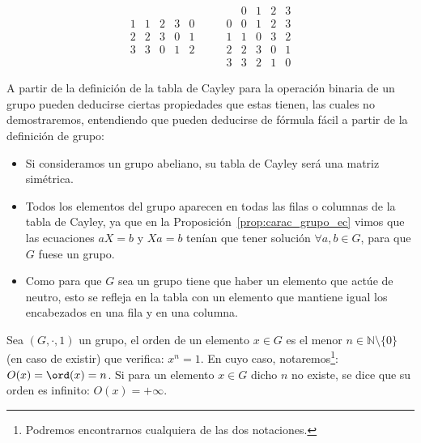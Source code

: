 \begin{ejemplo}
\begin{enumerate}
\begin{equation*}
\begin{array}{c|cccc}
                    1 & 1 & 2 & 3 & 0 \\
                    2 & 2 & 3 &  0 & 1 \\
                    3 & 3 & 0 & 1 & 2
                \end{array} \qquad 
                \begin{array}{c|cccc}
                     & 0 & 1 & 2 & 3 \\
                     \hline 
                    0 & 0 & 1 & 2 & 3 \\
                    1 & 1 & 0 & 3  & 2\\
                    2& 2 & 3 & 0 & 1 \\ 
                    3 & 3 & 2 & 1 & 0
                \end{array}
            \end{equation*}
    \end{enumerate}
    A partir de la definición de la tabla de Cayley para la operación binaria de un grupo pueden deducirse ciertas propiedades que estas tienen, las cuales no demostraremos, entendiendo que pueden deducirse de fórmula fácil a partir de la definición de grupo:
    \begin{itemize}
        \item Si consideramos un grupo abeliano, su tabla de Cayley será una matriz simétrica.
        \item Todos los elementos del grupo aparecen en todas las filas o columnas de la tabla de Cayley, ya que en la Proposición~\ref{prop:carac_grupo_ec} vimos que las ecuaciones $aX=b$ y $Xa=b$ tenían que tener solución $\forall a,b\in G$, para que $G$ fuese un grupo.
        \item Como para que $G$ sea un grupo tiene que haber un elemento que actúe de neutro, esto se refleja en la tabla con un elemento que mantiene igual los encabezados en una fila y en una columna.
    \end{itemize}
\end{ejemplo}

\begin{definicion}
    Sea $(G,\cdot,1)$ un grupo, el orden de un elemento $x\in G$ es el menor $n\in \mathbb{N}\setminus\{0\}$ (en caso de existir) que verifica: $x^n = 1$. En cuyo caso, notaremos\footnote{Podremos encontrarnos cualquiera de las dos notaciones.}: $O(x) = \ord(x) = n$.\newline
    Si para un elemento $x\in G$ dicho $n$ no existe, se dice que su orden es infinito: $O(x) = +\infty$.
\end{definicion}

